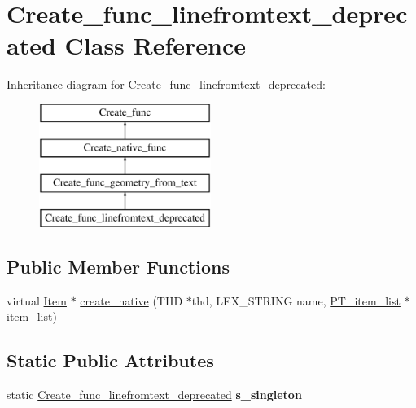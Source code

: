 \hypertarget{classCreate__func__linefromtext__deprecated}{}\section{Create\+\_\+func\+\_\+linefromtext\+\_\+deprecated Class Reference}
\label{classCreate__func__linefromtext__deprecated}
Inheritance diagram for Create\+\_\+func\+\_\+linefromtext\+\_\+deprecated\+:\begin{figure}[H]
\begin{center}
\leavevmode
\includegraphics[height=4.000000cm]{classCreate__func__linefromtext__deprecated}
\end{center}
\end{figure}
\subsection*{Public Member Functions}
\begin{DoxyCompactItemize}
\item 
virtual \mbox{\hyperlink{classItem}{Item}} $\ast$ \mbox{\hyperlink{classCreate__func__linefromtext__deprecated_aa8e6c707d1a042ae6b57389b005f7e35}{create\+\_\+native}} (T\+HD $\ast$thd, L\+E\+X\+\_\+\+S\+T\+R\+I\+NG name, \mbox{\hyperlink{classPT__item__list}{P\+T\+\_\+item\+\_\+list}} $\ast$item\+\_\+list)
\end{DoxyCompactItemize}
\subsection*{Static Public Attributes}
\begin{DoxyCompactItemize}
\item 
\mbox{\label{classCreate__func__linefromtext__deprecated_a5018325b52082f34d51907aa8b3e91b9}} 
static \mbox{\hyperlink{classCreate__func__linefromtext__deprecated}{Create\+\_\+func\+\_\+linefromtext\+\_\+deprecated}} {\bfseries s\+\_\+singleton}
\end{DoxyCompactItemize}
